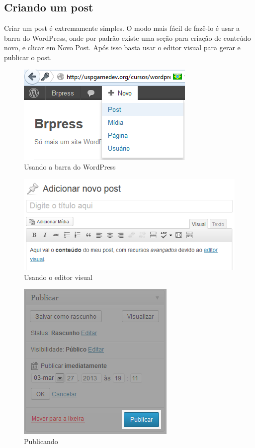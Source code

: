 \documentclass[12pt,onecolumn]{article}
\begin{document}
	\subsection{Criando um post}
		Criar um post é extremamente simples. O modo mais fácil de fazê-lo é usar a barra do WordPress,
		onde por padrão existe uma seção para criação de conteúdo novo, e clicar em Novo Post. Após isso
		basta usar o editor visual para gerar e publicar o post.
		\begin{figure}[H]
			\centering
			\includegraphics{post1.png}
			\caption{Usando a barra do WordPress}
		\end{figure}
		\begin{figure}[H]
			\centering
			\includegraphics{post2.png}
			\caption{Usando o editor visual}
		\end{figure}
		\begin{figure}[H]
			\centering
			\includegraphics{post3.png}
			\caption{Publicando}
		\end{figure}
\end{document}
